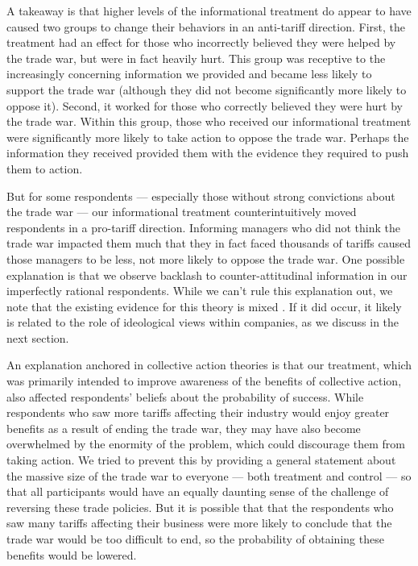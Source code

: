 \documentclass{article}
\begin{document}
A takeaway is that higher levels of the informational treatment do appear to have caused two groups to change their behaviors in an anti-tariff direction. First, the treatment had an effect for those who incorrectly believed they were helped by the trade war, but were in fact heavily hurt. This group was receptive to the increasingly concerning information we provided and became less likely to support the trade war (although they did not become significantly more likely to oppose it). Second, it worked for those who correctly believed they were hurt by the trade war. Within this group, those who received our informational treatment were significantly more likely to take action to oppose the trade war. Perhaps the information they received provided them with the evidence they required to push them to action.

But for some respondents --- especially those without strong convictions about the trade war --- our informational treatment counterintuitively moved respondents in a pro-tariff direction. Informing managers who did not think the trade war impacted them much that they in fact faced thousands of tariffs caused those managers to be less, not more likely to oppose the trade war. One possible explanation is that we observe backlash to counter-attitudinal information in our imperfectly rational respondents. While we can't rule this explanation out, we note that the existing evidence for this theory is mixed \citep{guess2020does}. If it did occur, it likely is related to the role of ideological views within companies, as we discuss in the next section.

An explanation anchored in collective action theories is that our treatment, which was primarily intended to improve awareness of the benefits of collective action, also affected respondents' beliefs about the probability of success. While respondents who saw more tariffs affecting their industry would enjoy greater benefits as a result of ending the trade war, they may have also become overwhelmed by the enormity of the problem, which could discourage them from taking action. We tried to prevent this by providing a general statement about the massive size of the trade war to everyone --- both treatment and control --- so that all participants would have an equally daunting sense of the challenge of reversing these trade policies. But it is possible that that the respondents who saw many tariffs affecting their business were more likely to conclude that the trade war would be too difficult to end, so the probability of obtaining these benefits would be lowered.
\end{document}
